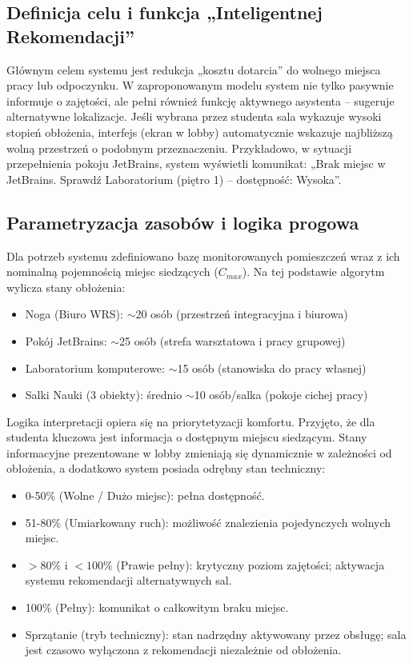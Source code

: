\documentclass[14pt,a4paper]{extarticle}
\begin{document}
\subsection{Definicja celu i funkcja „Inteligentnej Rekomendacji”}
Głównym celem systemu jest redukcja „kosztu dotarcia” do wolnego miejsca pracy lub odpoczynku. W zaproponowanym modelu system nie tylko pasywnie informuje o zajętości, ale pełni również funkcję aktywnego asystenta -- sugeruje alternatywne lokalizacje. Jeśli wybrana przez studenta sala wykazuje wysoki stopień obłożenia, interfejs (ekran w lobby) automatycznie wskazuje najbliższą wolną przestrzeń o podobnym przeznaczeniu. Przykładowo, w sytuacji przepełnienia pokoju JetBrains, system wyświetli komunikat: „Brak miejsc w JetBrains. Sprawdź Laboratorium (piętro 1) -- dostępność: Wysoka”.

\subsection{Parametryzacja zasobów i logika progowa}
Dla potrzeb systemu zdefiniowano bazę monitorowanych pomieszczeń wraz z ich nominalną pojemnością miejsc siedzących ($C_{max}$). Na tej podstawie algorytm wylicza stany obłożenia:
\begin{itemize}
    \item Noga (Biuro WRS): $\sim$20 osób (przestrzeń integracyjna i biurowa)
    \item Pokój JetBrains: $\sim$25 osób (strefa warsztatowa i pracy grupowej)
    \item Laboratorium komputerowe: $\sim$15 osób (stanowiska do pracy własnej)
    \item Salki Nauki (3 obiekty): średnio $\sim$10 osób/salka (pokoje cichej pracy)
\end{itemize}
Logika interpretacji opiera się na priorytetyzacji komfortu. Przyjęto, że dla studenta kluczowa jest informacja o dostępnym miejscu siedzącym. Stany informacyjne prezentowane w lobby zmieniają się dynamicznie w zależności od obłożenia, a dodatkowo system posiada odrębny stan techniczny:
\begin{itemize}
    \item 0-50\% (Wolne / Dużo miejsc): pełna dostępność.
    \item 51-80\% (Umiarkowany ruch): możliwość znalezienia pojedynczych wolnych miejsc.
    \item $>80\%$ i $<100\%$ (Prawie pełny): krytyczny poziom zajętości; aktywacja systemu rekomendacji alternatywnych sal.
    \item 100\% (Pełny): komunikat o całkowitym braku miejsc.
    \item Sprzątanie (tryb techniczny): stan nadrzędny aktywowany przez obsługę; sala jest czasowo wyłączona z rekomendacji niezależnie od obłożenia.
\end{itemize}
\end{document}
